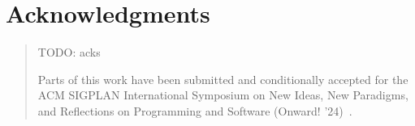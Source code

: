 
\begingroup
\let\raggedsection\centering

\chapter*{Acknowledgments}
\label{cha:acknowledgments}
\endgroup
\begin{quotation}
	\noindent TODO: acks

	\ParSep

	Parts of this work have been submitted and conditionally accepted for the ACM SIGPLAN International Symposium on New Ideas, New Paradigms, and Reflections on Programming and Software (Onward! ’24)~\cite{thiede2024talking}.
\end{quotation}
